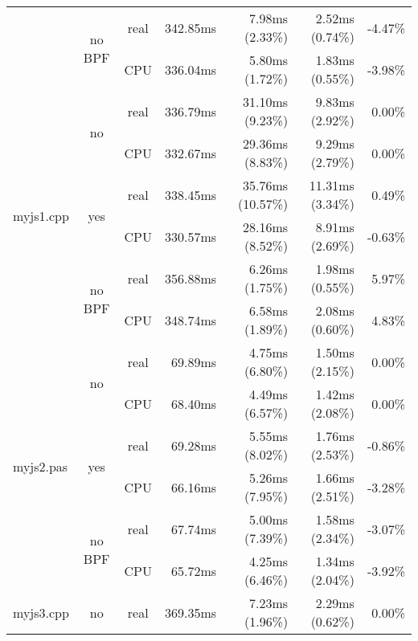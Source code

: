 \documentclass[en]{pracamgr}
\begin{document}
\begin{appendices}
\begin{small}
\begin{longtable}{|l|c|c|r|r|r|r|}
                            \cline{2-7}
                            & \multirow{2}{*}{no BPF} & real & 342.85ms & 7.98ms (2.33\%) & 2.52ms (0.74\%) & -4.47\% \\*
                            &                         & CPU  & 336.04ms & 5.80ms (1.72\%) & 1.83ms (0.55\%) & -3.98\% \\
\hline
\multirow{6}{*}{myjs1.cpp}  & \multirow{2}{*}{no}     & real & 336.79ms & 31.10ms (9.23\%) & 9.83ms (2.92\%) & 0.00\% \\*
                            &                         & CPU  & 332.67ms & 29.36ms (8.83\%) & 9.29ms (2.79\%) & 0.00\% \\*
                            \cline{2-7}
                            & \multirow{2}{*}{yes}    & real & 338.45ms & 35.76ms (10.57\%) & 11.31ms (3.34\%) & 0.49\% \\*
                            &                         & CPU  & 330.57ms & 28.16ms (8.52\%) & 8.91ms (2.69\%) & -0.63\% \\*
                            \cline{2-7}
                            & \multirow{2}{*}{no BPF} & real & 356.88ms & 6.26ms (1.75\%) & 1.98ms (0.55\%) & 5.97\% \\*
                            &                         & CPU  & 348.74ms & 6.58ms (1.89\%) & 2.08ms (0.60\%) & 4.83\% \\
\hline
\multirow{6}{*}{myjs2.pas}  & \multirow{2}{*}{no}     & real & 69.89ms & 4.75ms (6.80\%) & 1.50ms (2.15\%) & 0.00\% \\*
                            &                         & CPU  & 68.40ms & 4.49ms (6.57\%) & 1.42ms (2.08\%) & 0.00\% \\*
                            \cline{2-7}
                            & \multirow{2}{*}{yes}    & real & 69.28ms & 5.55ms (8.02\%) & 1.76ms (2.53\%) & -0.86\% \\*
                            &                         & CPU  & 66.16ms & 5.26ms (7.95\%) & 1.66ms (2.51\%) & -3.28\% \\*
                            \cline{2-7}
                            & \multirow{2}{*}{no BPF} & real & 67.74ms & 5.00ms (7.39\%) & 1.58ms (2.34\%) & -3.07\% \\*
                            &                         & CPU  & 65.72ms & 4.25ms (6.46\%) & 1.34ms (2.04\%) & -3.92\% \\
\hline
\multirow{6}{*}{myjs3.cpp}  & \multirow{2}{*}{no}     & real & 369.35ms & 7.23ms (1.96\%) & 2.29ms (0.62\%) & 0.00\% \\*

\end{longtable}
\end{small}
\end{appendices}
\end{document}
